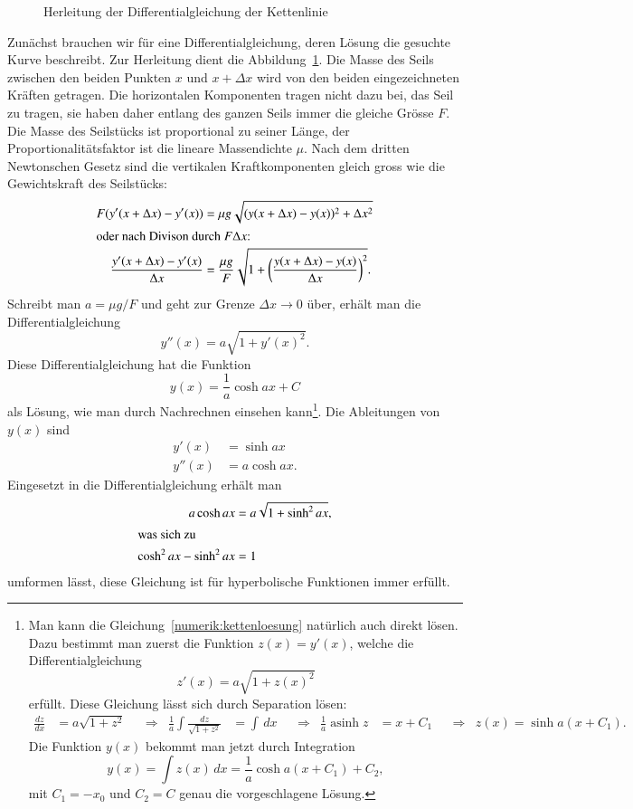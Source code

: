 \begin{loesung}
\def\asinh{\operatorname{asinh}}
\begin{figure}
\centering
\caption{Herleitung der Differentialgleichung der Kettenlinie
\label{numerik:kettenlinie}}
\end{figure}
Zunächst brauchen wir für eine Differentialgleichung, deren Lösung die
gesuchte Kurve beschreibt.
Zur Herleitung dient die Abbildung~\ref{numerik:kettenlinie}.
Die Masse des Seils zwischen den beiden Punkten $x$ und $x+\Delta x$
wird von den beiden eingezeichneten Kräften getragen.
Die horizontalen Komponenten tragen nicht dazu bei, das Seil zu
tragen, sie haben daher entlang des ganzen Seils immer die gleiche
Grösse $F$.
Die Masse des Seilstücks ist proportional zu seiner Länge,
der Proportionalitätsfaktor ist die lineare Massendichte $\mu$.
Nach dem dritten Newtonschen Gesetz
sind die vertikalen Kraftkomponenten gleich gross wie die Gewichtskraft
des Seilstücks:
\begin{align*}
F(y'(x+\Delta x)-y'(x))
&= \mu g\sqrt{(y(x+\Delta x)-y(x))^2+\Delta x^2}
\\
\intertext{oder nach Divison durch $F\Delta x$:}
\frac{y'(x+\Delta x)-y'(x)}{\Delta x}
&=\frac{\mu g}{F}\sqrt{1+\biggl(\frac{y(x+\Delta x)-y(x)}{\Delta x}\biggr)^2}.
\end{align*}
Schreibt man $a=\mu g/F$ und geht zur Grenze $\Delta x\to 0$ über,
erhält man die Differentialgleichung
\begin{equation}
y''(x)=a\sqrt{1+y'(x)^2}.
\label{numerik:kettenloesung}
\end{equation}
Diese Differentialgleichung hat die Funktion
\[
y(x) = \frac1a \cosh ax + C
\]
als Lösung, wie man durch Nachrechnen einsehen kann\footnote{
Man kann die Gleichung~\eqref{numerik:kettenloesung} natürlich auch direkt
lösen. Dazu bestimmt man zuerst die Funktion $z(x)=y'(x)$, welche die
Differentialgleichung
\[
z'(x)=a\sqrt{1+z(x)^2}
\]
erfüllt.
Diese Gleichung lässt sich durch Separation lösen:
\[
\begin{aligned}
\frac{dz}{dx}&=a\sqrt{1+z^2}
&&\Rightarrow&
\frac1a \int\frac{dz}{\sqrt{1+z^2}}&=\int \,dx
&&\Rightarrow&
\frac1a \asinh z &=x+C_1
&&\Rightarrow&
z(x)=\sinh a(x+C_1).
\end{aligned}
\]
Die Funktion $y(x)$ bekommt man jetzt durch Integration
\[
y(x)=\int z(x)\,dx = \frac1a \cosh a(x+C_1) + C_2,
\]
mit $C_1 = -x_0$ und $C_2=C$ genau die vorgeschlagene Lösung.
}.
Die Ableitungen von $y(x)$ sind
\begin{align*}
y' (x) &=  \sinh ax\\
y''(x) &= a\cosh ax.
\end{align*}
Eingesetzt in die Differentialgleichung erhält man
\begin{align*}
a\cosh ax&=a\sqrt{1+\sinh^2 ax},
\\
\intertext{was sich zu}
\cosh^2ax-\sinh^2ax&=1
\end{align*}
umformen lässt, diese Gleichung ist für hyperbolische Funktionen
immer erfüllt.


\end{loesung}
